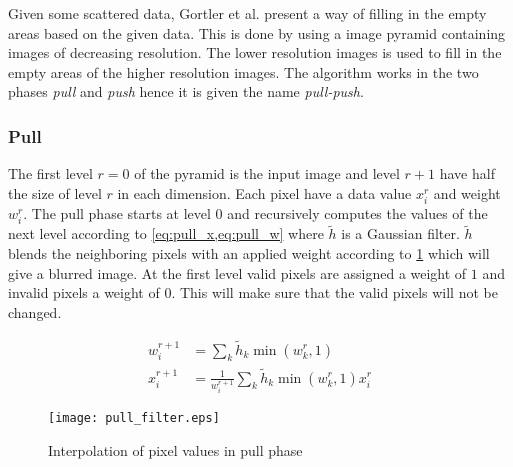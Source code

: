 Given some scattered data, Gortler et al. \cite{Gortler96thelumigraph} present a way of filling in the empty areas based on the given data. This is done by using a image pyramid containing images of decreasing resolution. The lower resolution images is used to fill in the empty areas of the higher resolution images. The algorithm works in the two phases \emph{pull} and \emph{push} hence it is given the name \emph{pull-push}.

\begin{subs}
\subsubsection{Pull}
The first level $r = 0$ of the pyramid is the input image and level $r + 1$ have half the size of level $r$ in each dimension. Each pixel have a data value $x^r_i$ and weight $w^r_i$. The pull phase starts at level 0 and recursively computes the values of the next level according to \cref{eq:pull_x,eq:pull_w} where $\tilde{h}$ is a Gaussian filter. $\tilde{h}$ blends the neighboring pixels with an applied weight according to \cref{fig:pull_filter} which will give a blurred image. At the first level valid pixels are assigned a weight of $1$ and invalid pixels a weight of $0$. This will make sure that the valid pixels will not be changed.

\begin{align}
  w^{r+1}_i &= \sum_k {\tilde{h}_k \min(w^r_k,1)} \label{eq:pull_x}\\
  x^{r+1}_i &= \frac{1}{w^{r+1}_i} \sum_k {\tilde{h}_k \min(w^r_k,1) x^r_i} \label{eq:pull_w}
\end{align}



\begin{figure}[h]
    \centering
    \texttt{[image: pull\_filter.eps]}
    \caption{Interpolation of pixel values in pull phase}
    \label{fig:pull_filter}
\end{figure}
\end{subs}

